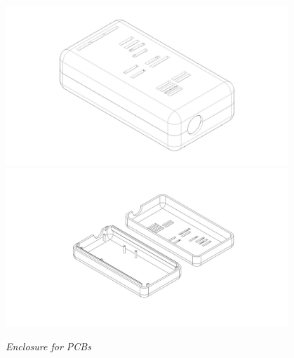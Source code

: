 \documentclass[8pt,compress,aspectratio=169]{beamer}
\begin{document}
\begin{frame}
\begin{minipage}{0.475\textwidth}
  \end{minipage}
  \hfill
  \begin{minipage}{0.45\textwidth}
    \begin{figure}
      \includegraphics[width=0.95\textwidth]{assets/electronic/psperi_enclosure_final_testpic1.jpg}
      \includegraphics[width=0.95\textwidth]{assets/electronic/psperi_enclosure_final_testpic2.jpg}
      \caption{\it Enclosure for PCBs}
    \end{figure}
  \end{minipage}
\end{frame}

\end{document}
